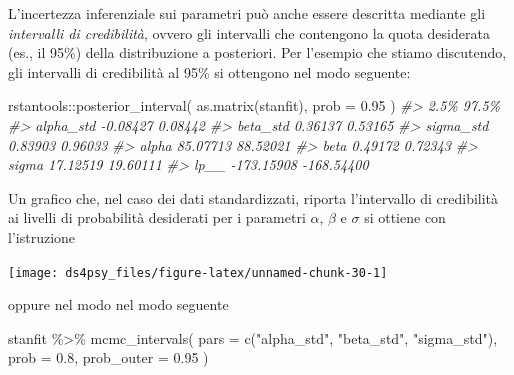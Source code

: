 \documentclass[
  11pt,
]{krantz}
\makeatletter
\newenvironment{Shaded}{\begin{snugshade}}{\end{snugshade}}
\newcommand{\AttributeTok}[1]{\textcolor[rgb]{0.61,0.61,0.61}{#1}}
\newcommand{\CommentTok}[1]{\textcolor[rgb]{0.37,0.37,0.37}{\textit{#1}}}
\newcommand{\FloatTok}[1]{\textcolor[rgb]{0.06,0.06,0.06}{#1}}
\newcommand{\FunctionTok}[1]{\textcolor[rgb]{0,0,0}{#1}}
\newcommand{\NormalTok}[1]{#1}
\newcommand{\SpecialCharTok}[1]{\textcolor[rgb]{0,0,0}{#1}}
\newcommand{\StringTok}[1]{\textcolor[rgb]{0.5,0.5,0.5}{#1}}
\newenvironment{kframe}{%
\medskip{}
\setlength{\fboxsep}{.8em}
 \def\at@end@of@kframe{}%
 \ifinner\ifhmode%
  \def\at@end@of@kframe{\end{minipage}}%
  \begin{minipage}{\columnwidth}%
 \fi\fi%
 \def\FrameCommand##1{\hskip\@totalleftmargin \hskip-\fboxsep
 \colorbox{shadecolor}{##1}\hskip-\fboxsep
     \hskip-\linewidth \hskip-\@totalleftmargin \hskip\columnwidth}%
 \MakeFramed {\advance\hsize-\width
   \@totalleftmargin\z@ \linewidth\hsize
   \@setminipage}}%
 {\par\unskip\endMakeFramed%
 \at@end@of@kframe}
\renewenvironment{Shaded}{\begin{kframe}}{\end{kframe}}
\theoremstyle{definition}
\theoremstyle{definition}
\theoremstyle{definition}
\theoremstyle{definition}
\theoremstyle{remark}
\makeatother
\begin{document}
L'incertezza inferenziale sui parametri può anche essere descritta mediante gli \emph{intervalli di credibilità}, ovvero gli intervalli che contengono la quota desiderata (es., il 95\%) della distribuzione a posteriori. Per l'esempio che stiamo discutendo, gli intervalli di credibilità al 95\% si ottengono nel modo seguente:

\begin{Shaded}
\begin{Highlighting}[]
\NormalTok{rstantools}\SpecialCharTok{::}\FunctionTok{posterior\_interval}\NormalTok{(}
  \FunctionTok{as.matrix}\NormalTok{(stanfit),}
  \AttributeTok{prob =} \FloatTok{0.95}
\NormalTok{)}
\CommentTok{\#\textgreater{}                 2.5\%      97.5\%}
\CommentTok{\#\textgreater{} alpha\_std   {-}0.08427    0.08442}
\CommentTok{\#\textgreater{} beta\_std     0.36137    0.53165}
\CommentTok{\#\textgreater{} sigma\_std    0.83903    0.96033}
\CommentTok{\#\textgreater{} alpha       85.07713   88.52021}
\CommentTok{\#\textgreater{} beta         0.49172    0.72343}
\CommentTok{\#\textgreater{} sigma       17.12519   19.60111}
\CommentTok{\#\textgreater{} lp\_\_      {-}173.15908 {-}168.54400}
\end{Highlighting}
\end{Shaded}

Un grafico che, nel caso dei dati standardizzati, riporta l'intervallo di credibilità ai livelli di probabilità desiderati per i parametri \(\alpha\), \(\beta\) e \(\sigma\) si ottiene con l'istruzione

\begin{Shaded}
\end{Shaded}

\begin{center}\texttt{[image: ds4psy\_files/figure-latex/unnamed-chunk-30-1]} \end{center}

oppure nel modo nel modo seguente

\begin{Shaded}
\begin{Highlighting}[]
\NormalTok{stanfit }\SpecialCharTok{\%\textgreater{}\%}
  \FunctionTok{mcmc\_intervals}\NormalTok{(}
    \AttributeTok{pars =} \FunctionTok{c}\NormalTok{(}\StringTok{"alpha\_std"}\NormalTok{, }\StringTok{"beta\_std"}\NormalTok{, }\StringTok{"sigma\_std"}\NormalTok{),}
    \AttributeTok{prob =} \FloatTok{0.8}\NormalTok{,}
    \AttributeTok{prob\_outer =} \FloatTok{0.95}
\NormalTok{  )}
\end{Highlighting}
\end{Shaded}
\end{document}
